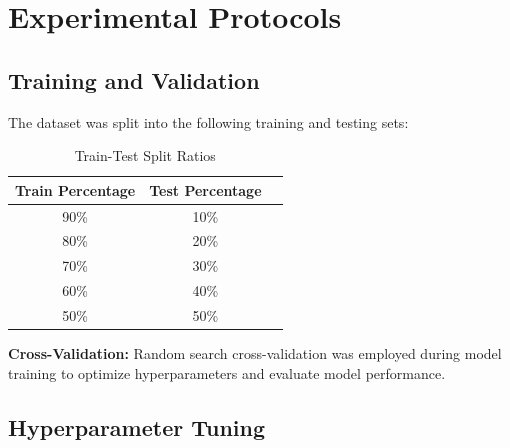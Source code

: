 \documentclass[a4paper,12pt]{report}
\begin{document}
\section{Experimental Protocols}

\subsection{Training and Validation}
 The dataset was split into the following training and testing sets:
\begin{table}[h!]
\centering
\begin{tabular}{|c|c|c|}
\hline
\textbf{Train Percentage} & \textbf{Test Percentage} \\ \hline
90\% & 10\% \\ \hline
80\% & 20\% \\ \hline
70\% & 30\% \\ \hline
60\% & 40\% \\ \hline
50\% & 50\% \\ \hline
\end{tabular}
\caption{Train-Test Split Ratios}
\label{table:train_test_split}
\end{table}
{}
 \newline\textbf{Cross-Validation:} Random search cross-validation was employed during model training to optimize hyperparameters and evaluate model performance.


\subsection{Hyperparameter Tuning}
\end{document}
